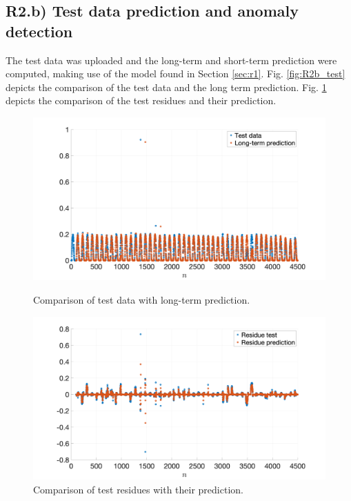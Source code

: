 \documentclass[a4paper, oneside, 11pt]{article}
\begin{document}
\subsection{R2.b) Test data prediction and anomaly detection}\label{sec:r2b}
The test data was uploaded and the long-term and short-term prediction were computed, making use of the model found in Section \ref{sec:r1}. Fig. \ref{fig:R2b_test} depicts the comparison of the test data and the long term prediction. Fig. \ref{fig:R2b_residual} depicts the comparison of the test residues and their prediction. 
\begin{figure}[htbp]
	\centering
	\begin{minipage}[b]{.49\textwidth}
		\centering
		\includegraphics[width= 1.1\textwidth]{figures/R2b_test.png}
		\caption{Comparison of test data with long-term prediction.}
		\label{fig:R2b_test}
	\end{minipage}
	\hfill
	\begin{minipage}[b]{.49\textwidth}
		\centering
		\includegraphics[width= 1.1\textwidth]{figures/R2b_residual.png}
		\caption{Comparison of test residues with their  prediction.}
		\label{fig:R2b_residual}
	\end{minipage}
\end{figure}
\end{document}

